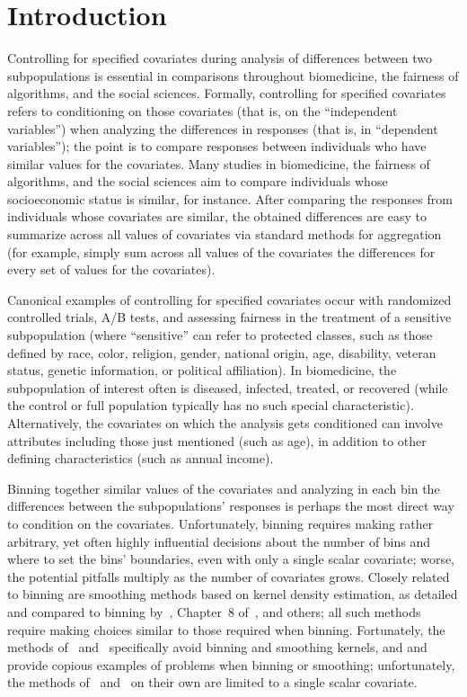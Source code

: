 \documentclass{article}
\begin{document}
\section{Introduction}
\label{intro}

Controlling for specified covariates during analysis of differences
between two subpopulations is essential in comparisons
throughout biomedicine, the fairness of algorithms,
and the social sciences.
Formally, controlling for specified covariates refers to conditioning
on those covariates (that is, on the ``independent variables'') when analyzing
the differences in responses (that is, in ``dependent variables'');
the point is to compare responses between individuals
who have similar values for the covariates.
Many studies in biomedicine, the fairness of algorithms,
and the social sciences aim to compare individuals
whose socioeconomic status is similar, for instance.
After comparing the responses from individuals whose covariates are similar,
the obtained differences are easy to summarize across all values of covariates
via standard methods for aggregation (for example, simply sum across all values
of the covariates the differences for every set of values for the covariates).

Canonical examples of controlling for specified covariates
occur with randomized controlled trials, A/B tests, and assessing fairness
in the treatment of a sensitive subpopulation (where ``sensitive''
can refer to protected classes, such as those defined by race, color, religion,
gender, national origin, age, disability, veteran status, genetic information,
or political affiliation). In biomedicine, the subpopulation of interest
often is diseased, infected, treated, or recovered (while the control
or full population typically has no such special characteristic).
Alternatively, the covariates on which the analysis gets conditioned
can involve attributes including those just mentioned (such as age),
in addition to other defining characteristics (such as annual income).

Binning together similar values of the covariates and analyzing in each bin
the differences between the subpopulations' responses is perhaps
the most direct way to condition on the covariates.
Unfortunately, binning requires making rather arbitrary,
yet often highly influential decisions about the number of bins
and where to set the bins' boundaries,
even with only a single scalar covariate;
worse, the potential pitfalls multiply as the number of covariates grows.
Closely related to binning are smoothing methods based
on kernel density estimation, as detailed and compared to binning
by~\cite{srihera-stute}, Chapter~8 of~\cite{wilks}, and others;
all such methods require making choices similar to those required when binning.
Fortunately, the methods of~\cite{tygert_full} and~\cite{tygert_two}
specifically avoid binning and smoothing kernels,
and \cite{tygert_full} and~\cite{tygert_two} provide
copious examples of problems when binning or smoothing; unfortunately,
the methods of~\cite{tygert_full} and~\cite{tygert_two} on their own
are limited to a single scalar covariate.
\end{document}
